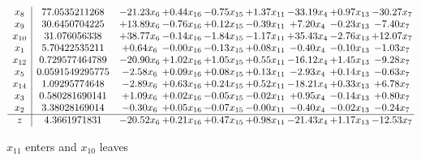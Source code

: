 \documentclass[9pt]{article}
\begin{document}
 \[\begin{array}{c| c c@{\hskip 2pt} c@{\hskip 2pt} c@{\hskip 2pt} c@{\hskip 2pt} c@{\hskip 2pt} c@{\hskip 2pt} c@{\hskip 2pt} }
 x_{8}   &  77.0535211268 & -21.23 x_{6} & +  0.44 x_{16} & -0.75 x_{15} & +  1.37 x_{11} & -33.19 x_{4} & +  0.97 x_{13} & -30.27 x_{7}\\
 x_{9}   &  30.6450704225 & + 13.89 x_{6} & -0.76 x_{16} & +  0.12 x_{15} & -0.39 x_{11} & +  7.20 x_{4} & -0.23 x_{13} & -7.40 x_{7}\\
 x_{10}   &  31.076056338 & + 38.77 x_{6} & -0.14 x_{16} & -1.84 x_{15} & -1.17 x_{11} & + 35.43 x_{4} & -2.76 x_{13} & + 12.07 x_{7}\\
 x_{1}   &  5.70422535211 & +  0.64 x_{6} & -0.00 x_{16} & -0.13 x_{15} & +  0.08 x_{11} & -0.40 x_{4} & -0.10 x_{13} & -1.03 x_{7}\\
 x_{12}   &  0.729577464789 & -20.90 x_{6} & +  1.02 x_{16} & +  1.05 x_{15} & +  0.55 x_{11} & -16.12 x_{4} & +  1.45 x_{13} & -9.28 x_{7}\\
 x_{5}   &  0.0591549295775 & -2.58 x_{6} & +  0.09 x_{16} & +  0.08 x_{15} & +  0.13 x_{11} & -2.93 x_{4} & +  0.14 x_{13} & -0.63 x_{7}\\
 x_{14}   &  1.09295774648 & -2.89 x_{6} & +  0.63 x_{16} & +  0.24 x_{15} & +  0.52 x_{11} & -18.21 x_{4} & +  0.33 x_{13} & +  6.78 x_{7}\\
 x_{3}   &  0.580281690141 & +  1.09 x_{6} & +  0.02 x_{16} & -0.05 x_{15} & -0.02 x_{11} & +  0.95 x_{4} & -0.14 x_{13} & +  0.80 x_{7}\\
 x_{2}   &  3.38028169014 & -0.30 x_{6} & +  0.05 x_{16} & -0.07 x_{15} & -0.00 x_{11} & -0.40 x_{4} & -0.02 x_{13} & -0.24 x_{7}\\
\hline
z    &  4.3661971831 & -20.52 x_{6} & +  0.21 x_{16} & +  0.47 x_{15} & +  0.98 x_{11} & -21.43 x_{4} & +  1.17 x_{13} & -12.53 x_{7}\\
\end{array}\]


 $ x_{11} $ enters and $ x_{10} $ leaves 
\end{document}
